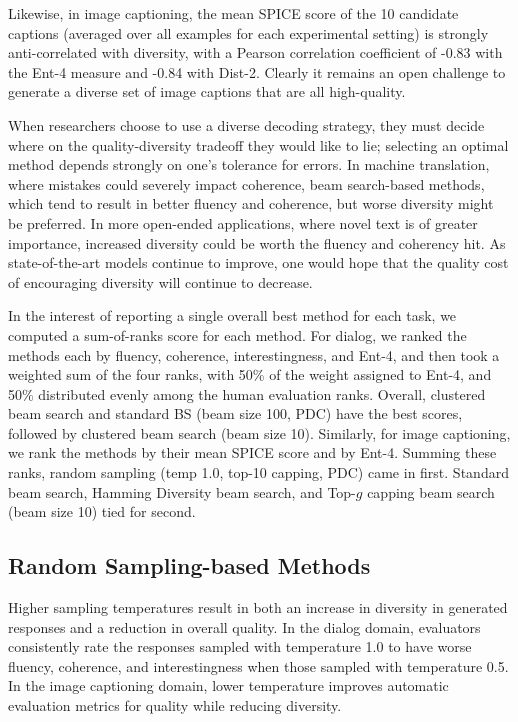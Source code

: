 Likewise, in image captioning, the mean SPICE score of the 10 candidate captions (averaged over all examples for each experimental setting) is strongly anti-correlated with diversity, with a Pearson correlation coefficient of -0.83 with the Ent-4 measure and -0.84 with Dist-2.
Clearly it remains an open challenge to generate a diverse set of image captions that are all high-quality.

When researchers choose to use a diverse decoding strategy, they must decide where on the quality-diversity tradeoff they would like to lie; selecting an optimal method depends strongly on one's tolerance for errors.
In machine translation, where mistakes could severely impact coherence, beam search-based methods, which tend to result in better fluency and coherence, but worse diversity might be preferred.  
In more open-ended applications, where novel text is of greater importance, increased diversity could be worth the fluency and coherency hit.
As state-of-the-art models continue to improve, one would hope that the quality cost of encouraging diversity will continue to decrease. 

In the interest of reporting a single overall best method for each task, we computed a sum-of-ranks score for each method.
For dialog, we ranked the methods each by fluency, coherence, interestingness, and Ent-4, and then took a weighted sum of the four ranks, with 50\% of the weight assigned to Ent-4, and 50\% distributed evenly among the human evaluation ranks.
Overall, clustered beam search and standard BS (beam size 100, PDC) have the best scores, followed by clustered beam search (beam size 10).
Similarly, for image captioning, we rank the methods by their mean SPICE score and by Ent-4.
Summing these ranks, random sampling (temp 1.0, top-10 capping, PDC) came in first.
Standard beam search, Hamming Diversity beam search, and Top-$g$ capping beam search (beam size 10) tied for second.

\subsection{Random Sampling-based Methods}
Higher sampling temperatures result in both an increase in diversity in generated responses and a reduction in overall quality.
In the dialog domain, evaluators consistently rate the responses sampled with temperature 1.0 to have worse fluency, coherence, and interestingness when those sampled with temperature 0.5.
In the image captioning domain, lower temperature improves automatic evaluation metrics for quality while reducing diversity.

